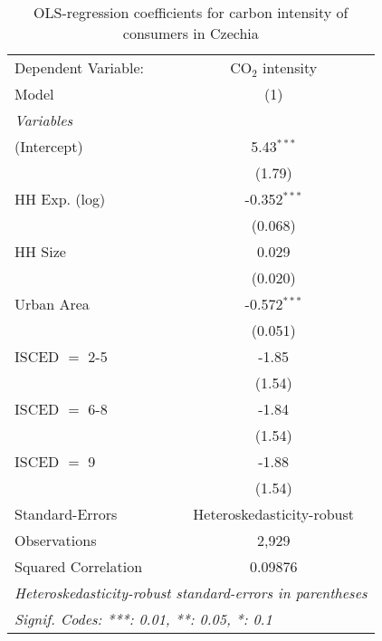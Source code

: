 
\begin{table}[htbp!]
   \centering
   \small
   \begin{adjustbox}{width = 1\textwidth, max height = 0.95\textheight, center}
      \begin{threeparttable}[b]
         \caption{\label{tab:OLS_1_CZE} OLS-regression coefficients for carbon intensity of consumers in Czechia}
         \begin{tabular}{lc}
            \tabularnewline \midrule \midrule
            Dependent Variable: & CO$_{2}$ intensity\\  
            Model               & (1)\\  
            \midrule
            \emph{Variables}\\
            (Intercept)         & 5.43$^{***}$\\   
                                & (1.79)\\   
            HH Exp. (log)       & -0.352$^{***}$\\   
                                & (0.068)\\   
            HH Size             & 0.029\\   
                                & (0.020)\\   
            Urban Area          & -0.572$^{***}$\\   
                                & (0.051)\\   
            ISCED $=$ 2-5       & -1.85\\   
                                & (1.54)\\   
            ISCED $=$ 6-8       & -1.84\\   
                                & (1.54)\\   
            ISCED $=$ 9         & -1.88\\   
                                & (1.54)\\   
            \midrule 
            Standard-Errors     & Heteroskedasticity-robust \\   
            Observations        & 2,929\\  
            Squared Correlation & 0.09876\\  
            \midrule \midrule
            \multicolumn{2}{l}{\emph{Heteroskedasticity-robust standard-errors in parentheses}}\\
            \multicolumn{2}{l}{\emph{Signif. Codes: ***: 0.01, **: 0.05, *: 0.1}}\\
         \end{tabular}
         

\end{threeparttable}
\end{adjustbox}
\end{table}
